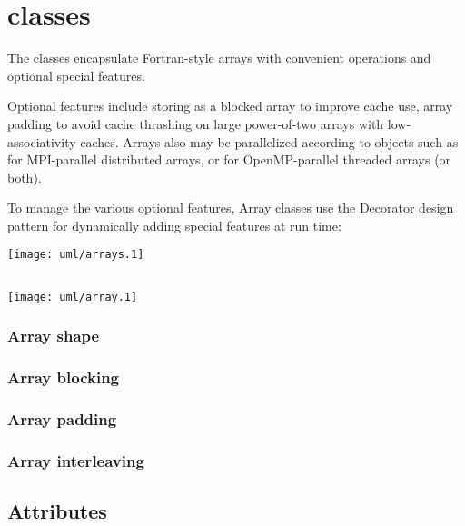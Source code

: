\section{ classes}

The  classes encapsulate Fortran-style arrays with
convenient operations and optional special features.  

Optional features include storing as a blocked array to improve cache
use, array padding to avoid cache thrashing on large power-of-two
arrays with low-associativity caches.  Arrays also may be parallelized
according to  objects such as
 for MPI-parallel distributed arrays, or
 for OpenMP-parallel threaded arrays (or both).

To manage the various optional features, Array classes use the
Decorator design pattern for dynamically adding special features at
run time:

 \centerline{\texttt{[image: uml/arrays.1]}}

\subsection{}

\centerline{\texttt{[image: uml/array.1]}}

\subsubsection{Array shape}

\subsubsection{Array blocking}

\subsubsection{Array padding}

\subsubsection{Array interleaving}


\subsection{Attributes}


